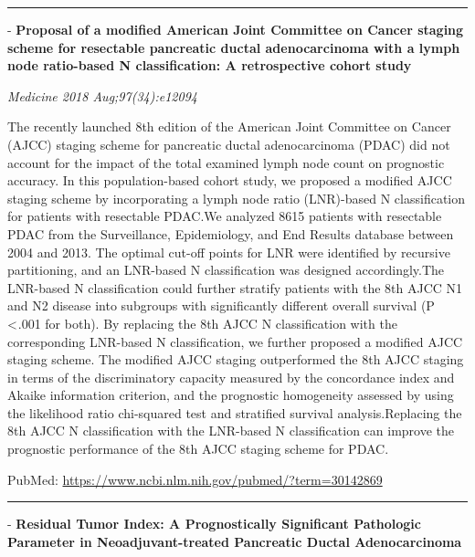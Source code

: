\documentclass[]{article}
\begin{document}
{}

\begin{center}\rule{0.5\linewidth}{\linethickness}\end{center}

 - \textbf{Proposal of a modified American Joint Committee on Cancer
staging scheme for resectable pancreatic ductal adenocarcinoma with a
lymph node ratio-based N classification: A retrospective cohort study}

\emph{Medicine 2018 Aug;97(34):e12094}

The recently launched 8th edition of the American Joint Committee on
Cancer (AJCC) staging scheme for pancreatic ductal adenocarcinoma (PDAC)
did not account for the impact of the total examined lymph node count on
prognostic accuracy. In this population-based cohort study, we proposed
a modified AJCC staging scheme by incorporating a lymph node ratio
(LNR)-based N classification for patients with resectable PDAC.We
analyzed 8615 patients with resectable PDAC from the Surveillance,
Epidemiology, and End Results database between 2004 and 2013. The
optimal cut-off points for LNR were identified by recursive
partitioning, and an LNR-based N classification was designed
accordingly.The LNR-based N classification could further stratify
patients with the 8th AJCC N1 and N2 disease into subgroups with
significantly different overall survival (P \textless{} .001 for both).
By replacing the 8th AJCC N classification with the corresponding
LNR-based N classification, we further proposed a modified AJCC staging
scheme. The modified AJCC staging outperformed the 8th AJCC staging in
terms of the discriminatory capacity measured by the concordance index
and Akaike information criterion, and the prognostic homogeneity
assessed by using the likelihood ratio chi-squared test and stratified
survival analysis.Replacing the 8th AJCC N classification with the
LNR-based N classification can improve the prognostic performance of the
8th AJCC staging scheme for PDAC.

PubMed: \url{https://www.ncbi.nlm.nih.gov/pubmed/?term=30142869}

{}

{}

\begin{center}\rule{0.5\linewidth}{\linethickness}\end{center}

 - \textbf{Residual Tumor Index: A Prognostically Significant Pathologic
Parameter in Neoadjuvant-treated Pancreatic Ductal Adenocarcinoma}
\end{document}
